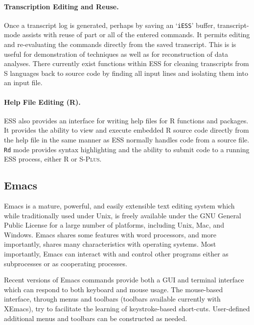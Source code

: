 \documentclass{article}
\newcommand*{\Splus}{\textsc{S-Plus}}
\newcommand{\stexttt}[1]{{\small\texttt{#1}}}
\newcommand{\file}[1]{`\stexttt{#1}'}
\begin{document}
\paragraph{Transcription Editing and Reuse.}
Once a transcript log is generated, perhaps by saving an \file{iESS}
buffer, transcript-mode assists with reuse of part or all of the
entered commands.  It permits editing and re-evaluating the commands
directly from the saved transcript.  This is is useful for
demonstration of techniques as well as for reconstruction of data
analyses.  There currently exist functions within ESS for cleaning
transcripts from S languages back to source code by finding all input
lines and isolating them into an input file.

\paragraph{Help File Editing (R).}
ESS also provides an interface for writing help files for R functions
and packages.  It provides the ability to view and execute embedded R
source code directly from the help file in the same manner as ESS
normally handles code from a source file.  \stexttt{Rd} mode provides
syntax highlighting and the ability to submit code to a running ESS
process, either R or \Splus.

\subsection{Emacs}
\label{sec:ESS:emacs}

Emacs \citep{RMS:2000} is a mature, powerful, and easily extensible
text editing system which while traditionally used under Unix, is
freely available under the GNU General Public License for a large
number of platforms, including Unix, Mac, and Windows.  Emacs shares
some features with word processors, and more importantly, shares many
characteristics with operating systems.  Most importantly, Emacs can
interact with and control other programs either as subprocesses or as
cooperating processes.

Recent versions of Emacs commands provide both a GUI and terminal
interface which can respond to both keyboard and mouse usage.  The
mouse-based interface, through menus and toolbars (toolbars available
currently with XEmacs), try to facilitate the learning of
keystroke-based short-cuts.  User-defined additional menus and
toolbars can be constructed as needed.
\end{document}
